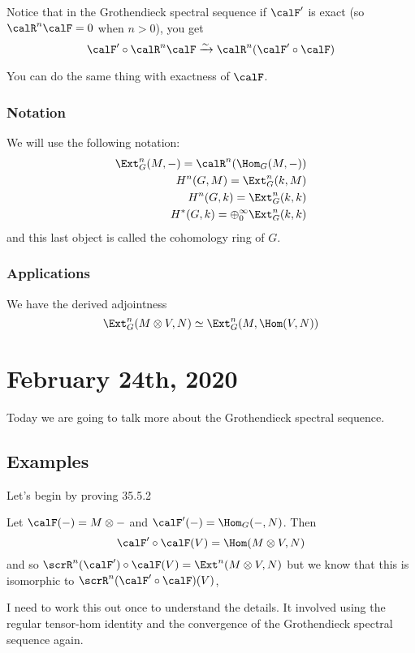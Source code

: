 \documentclass[12pt]{article}
\begin{document}
\begin{rmk}
	Notice that in the Grothendieck spectral sequence if $\calF'$ is exact (so $\calR^n\calF=0$ when $n>0$),
	you get 
	\[\calF'\circ\calR^n\calF\xrightarrow{\sim}\calR^n(\calF'\circ\calF)\]

	You can do the same thing with exactness of $\calF$.
\end{rmk}

\subsubsection{Notation}
We will use the following notation:
\begin{align*}
	\Ext_G^n(M,-)=\calR^n(\Hom_G(M,-))\\
	H^n(G,M)=\Ext_G^n(k,M)\\
	H^n(G,k)=\Ext^n_G(k,k)\\
	H^\ast(G,k)=\oplus_0^\infty\Ext_G^n(k,k)
\end{align*}
and this last object is called the cohomology ring of $G$.

\subsubsection{Applications}
\begin{prop}
	We have the derived adjointness 
	\[\Ext_G^n(M\otimes V,N)\simeq \Ext_G^n(M,\Hom(V,N))\]
\end{prop}

\section{February 24th, 2020}
Today we are going to talk more about the Grothendieck spectral sequence.
\subsection{Examples}
Let's begin by proving 35.5.2
\begin{prf}
	Let $\calF(-)=M\otimes -$ and $\calF'(-)=\Hom_G(-,N)$. Then 
	\[\calF'\circ\calF(V)=\Hom(M\otimes V,N)\]
	and so $\scrR^n(\calF')\circ \calF(V)=\Ext^n(M\otimes V,N)$
	but we know that this is isomorphic to $\scrR^n(\calF'\circ\calF)(V)$,
	
	I need to work this out once to understand the details. It involved using the regular tensor-hom identity and 
	the convergence of the Grothendieck spectral sequence again.
\end{prf}
\end{document}
